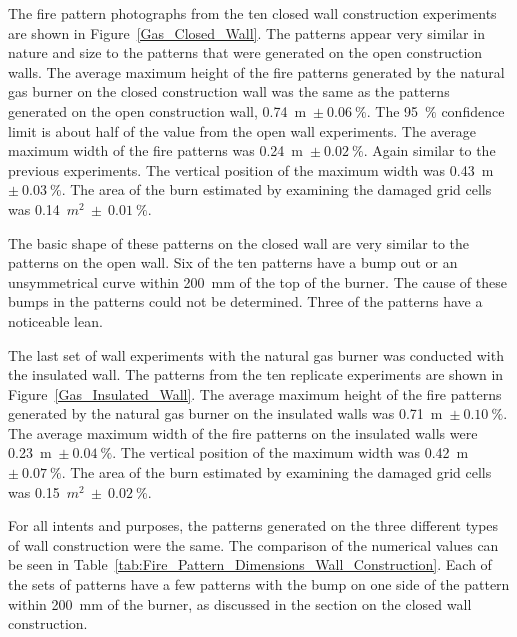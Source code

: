 \documentclass[twoside]{uocthesis}
\begin{document}
The fire pattern photographs from the ten closed wall construction experiments are shown in Figure~\ref{Gas_Closed_Wall}. 
The patterns appear very similar in nature and size to the patterns that were generated on the open construction walls.  The average maximum height of the fire patterns generated by the natural gas burner on the closed construction wall was the same as the patterns generated on the open construction wall, 0.74~m~$\pm~0.06~\%$.  The 95~$\%$ confidence limit is about half of the value from the open wall experiments. The average maximum width of the fire patterns was 0.24~m~$\pm~0.02~\%$.  Again similar to the previous experiments. The vertical position of the maximum width was 0.43~m~$\pm~0.03~\%$. The area of the burn estimated by examining the damaged grid cells was 0.14~$m^2~\pm~0.01~\%$.  

The basic shape of these patterns on the closed wall are very similar to the patterns on the open wall.  Six of the ten patterns have a bump out or an unsymmetrical curve within 200~mm of the top of the burner.  The cause of these bumps in the patterns could not be determined. Three of the patterns have a noticeable lean.     

The last set of wall experiments with the natural gas burner was conducted with the insulated wall.  The patterns from the ten replicate experiments are shown in Figure~\ref{Gas_Insulated_Wall}.  The average maximum height of the fire patterns generated by the natural gas burner on the insulated walls was 0.71~m~$\pm~0.10~\%$.  The average maximum width of the fire patterns on the insulated walls were 0.23~m~$\pm~0.04~\%$.  The vertical position of the maximum width was 0.42~m~$\pm~0.07~\%$. The area of the burn estimated by examining the damaged grid cells was 0.15~$m^2~\pm~0.02~\%$.  


For all intents and purposes, the patterns generated on the three different types of wall construction were the same.  The comparison of the numerical values can be seen in Table~\ref{tab:Fire_Pattern_Dimensions_Wall_Construction}.  Each of the sets of 
patterns have a few patterns with the bump on one side of the pattern within 200~mm of the burner, as discussed in the section on the closed wall construction. 
\end{document}
